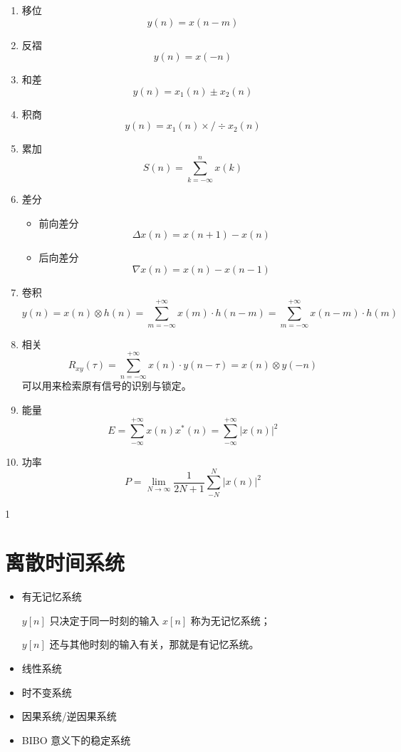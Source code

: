 \documentclass[cn,11pt,chinese,black,simple]{../elegantbook}
\begin{document}
\begin{enumerate}
    \item 移位 \[y(n) = x(n-m)\]
    \item 反褶 \[y(n) = x(-n)\]
    \item 和差 \[y(n) = x_1(n) \pm x_2(n)\]
    \item 积商 \[y(n) = x_1(n) \times / \div x_2(n)\]
    \item 累加 \[S(n) = \sum_{k=-\infty}^n x(k)\]
    \item 差分 \begin{itemize}
        \item 前向差分 \[\Delta x(n) = x(n+1) - x(n)\]
        \item 后向差分 \[\nabla x(n) = x(n) - x(n-1)\]
    \end{itemize}
    \item 卷积 \[y(n) = x(n) \otimes h(n) = \sum_{m=-\infty}^{+\infty}x(m)\cdot h(n-m) = \sum_{m=-\infty}^{+\infty}x(n-m)\cdot h(m)\]
    \item 相关 \[R_{xy}(\tau) = \sum_{n=-\infty}^{+\infty} x(n) \cdot y(n-\tau) = x(n) \otimes y(-n)\]
    可以用来检索原有信号的识别与锁定。
    \item 能量 \[E = \sum_{-\infty}^{+\infty} x(n) x^*(n) = \sum_{-\infty}^{+\infty} |x(n)|^2\]
    \item 功率 \[P = \lim_{N\rightarrow \infty} \frac{1}{2 N + 1} \sum_{-N}^N |x(n)|^2\]
\end{enumerate}1



\section{离散时间系统}



\begin{itemize}
    \item {有无记忆系统}

    \begin{definition}
        \(y[n]\) 只决定于同一时刻的输入 \(x[n]\) 称为无记忆系统；
    
        \(y[n]\) 还与其他时刻的输入有关，那就是有记忆系统。
    \end{definition}
    \item 线性系统    
    \item 时不变系统
    \item 因果系统/逆因果系统
    \item BIBO 意义下的稳定系统
\end{itemize}
\end{document}
